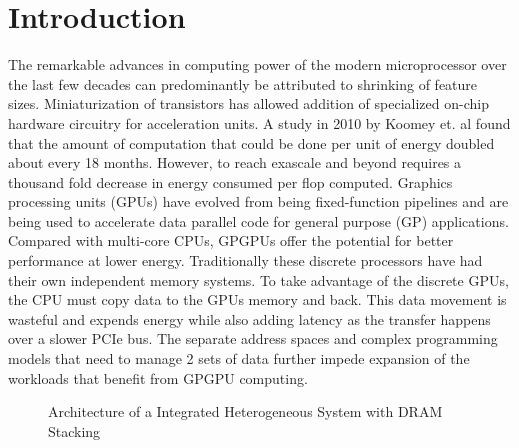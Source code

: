 \section{Introduction}\label{introduction}



\par The remarkable advances in computing power of the modern microprocessor over the last few decades can predominantly be attributed to shrinking of feature sizes. Miniaturization of transistors has allowed addition of specialized on-chip hardware circuitry for acceleration units. 
A study in 2010 by Koomey et. al \cite{koomey} found that the amount of computation that could be done per unit of energy doubled about every 18 months. However, to reach exascale and beyond requires a thousand fold decrease in energy consumed per flop computed. Graphics processing units (GPUs) have evolved from being fixed-function pipelines and are being used to accelerate data parallel code for general purpose (GP) applications. Compared with multi-core CPUs, GPGPUs offer the potential for better performance at lower energy. Traditionally these discrete processors have had their own independent memory systems. To take advantage of the discrete GPUs, the CPU must copy data to the GPUs memory and back. This data movement is wasteful and expends energy while also adding latency as the transfer happens over a slower PCIe bus. The separate address spaces and complex programming models that need to manage 2 sets of data further impede expansion of the workloads that benefit from GPGPU computing. 
\begin{figure}[!htb]
    \centering
    \hsacpu
    \caption{Architecture of a Integrated Heterogeneous System with DRAM Stacking}
    \label{fig:hsa-arch}
\end{figure}

